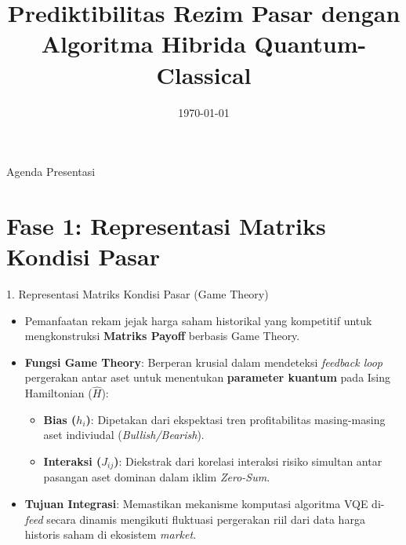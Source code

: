 \documentclass[aspectratio=169,xcolor=pdftex,dvipsnames,table]{beamer}
\title[VQE untuk Prediksi Rezim Pasar]{Prediktibilitas Rezim Pasar dengan Algoritma Hibrida Quantum-Classical}
\date{\today}
\begin{document}
\begin{frame}
  \titlepage
\end{frame}

\begin{frame}{Agenda Presentasi}
  \tableofcontents
\end{frame}

\section{Fase 1: Representasi Matriks Kondisi Pasar}
\begin{frame}{1. Representasi Matriks Kondisi Pasar (Game Theory)}
  \begin{itemize}
    \item Pemanfaatan rekam jejak harga saham historikal yang kompetitif untuk mengkonstruksi \textbf{Matriks Payoff} berbasis Game Theory.
    \item \textbf{Fungsi Game Theory}: Berperan krusial dalam mendeteksi \textit{feedback loop} pergerakan antar aset untuk menentukan \textbf{parameter kuantum} pada Ising Hamiltonian ($\hat{H}$):
    \begin{itemize}
        \item \textbf{Bias ($h_i$)}: Dipetakan dari ekspektasi tren profitabilitas masing-masing aset indiviudal (\textit{Bullish/Bearish}).
        \item \textbf{Interaksi ($J_{ij}$)}: Diekstrak dari korelasi interaksi risiko simultan antar pasangan aset dominan dalam iklim \textit{Zero-Sum}.
    \end{itemize}
    \item \textbf{Tujuan Integrasi}: Memastikan mekanisme komputasi algoritma VQE di-\textit{feed} secara dinamis mengikuti fluktuasi pergerakan riil dari data harga historis saham di ekosistem \textit{market}.
  \end{itemize}
\end{frame}
\end{document}

